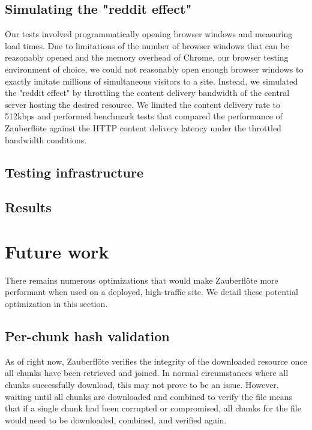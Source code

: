 \documentclass[letterpaper,twocolumn,10pt]{article}
\newcommand{\zbf}{Zauberfl\"{o}te\xspace}
\begin{document}
\subsection{Simulating the "reddit effect"}

Our tests involved programmatically opening browser windows and measuring load times.
Due to limitations of the number of browser windows that can be reasonably opened
and the memory overhead of Chrome, our browser testing environment of choice, we could
not reasonably open enough browser windows to exactly imitate millions of simultaneous
visitors to a site. Instead, we simulated the "reddit effect" by throttling the content delivery
bandwidth of the central server hosting the desired resource. We limited the content delivery
rate to 512kbps and performed benchmark tests that compared the performance of \zbf 
against the HTTP content delivery latency under the throttled bandwidth conditions.

\subsection{Testing infrastructure}


\subsection{Results}

\section{Future work}

There remains numerous optimizations that would make \zbf more performant
when used on a deployed, high-traffic site. We detail these potential optimization
in this section.

\subsection{Per-chunk hash validation}
As of right now, \zbf verifies the integrity of the downloaded resource once all
chunks have been retrieved and joined. In normal circumstances where all chunks
successfully download, this may not prove to be an issue. However, waiting until
all chunks are downloaded and combined to verify the file means that if a single
chunk had been corrupted or compromised, all chunks for the file would need to be
downloaded, combined, and verified again. \\
\end{document}
